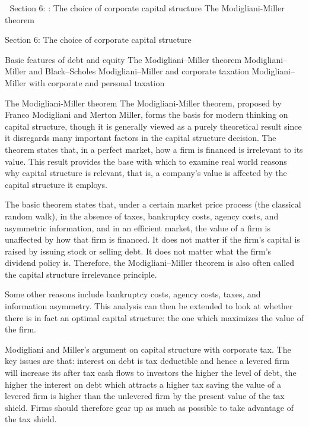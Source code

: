 

Section 6: : The choice of corporate capital structure
The Modigliani-Miller theorem


Section 6:  The choice of corporate capital structure

Basic features of debt and equity 
The Modigliani–Miller theorem
Modigliani–Miller and Black–Scholes
Modigliani–Miller and corporate taxation
Modigliani–Miller with corporate and personal taxation 

The Modigliani-Miller theorem
The Modigliani-Miller theorem, proposed by Franco Modigliani and Merton Miller, forms the basis for modern thinking on capital structure, though it is generally viewed as a purely theoretical result since it disregards many important factors in the capital structure decision. The theorem states that, in a perfect market, how a firm is financed is irrelevant to its value. This result provides the base with which to examine real world reasons why capital structure is relevant, that is, a company's value is affected by the capital structure it employs. 

The basic theorem states that, under a certain market price process (the classical random walk), in the absence of taxes, bankruptcy costs, agency costs, and asymmetric information, and in an efficient market, the value of a firm is unaffected by how that firm is financed. It does not matter if the firm's capital is raised by issuing stock or selling debt. It does not matter what the firm's dividend policy is. Therefore, the Modigliani–Miller theorem is also often called the capital structure irrelevance principle.

Some other reasons include bankruptcy costs, agency costs, taxes, and information asymmetry. This analysis can then be extended to look at whether there is in fact an optimal capital structure: the one which maximizes the value of the firm.


Modigliani and Miller’s argument on capital structure with corporate tax. 
The key issues are that:
interest on debt is tax deductible and hence a levered firm will increase its after tax cash flows to investors 
the higher the level of debt, the higher the interest on debt which attracts a higher tax saving 
the value of a levered firm is higher than the unlevered firm by the present value of the tax shield.
Firms should therefore gear up as much as possible to take advantage of the tax shield.



